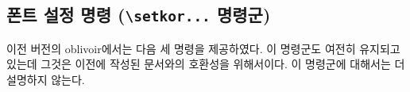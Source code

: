 \documentclass[
	12pt,
	a4paper,
	kosection,
	footnote,
	nobookmarks,
	microtype,
]{oblivoir}
\def\cs#1{\texttt{\textbackslash #1}}
\begin{document}

\subsection{폰트 설정 명령 (\protect\cs{setkor...} 명령군)}

이전 버전의 oblivoir에서는 다음 세 명령을 제공하였다.
이 명령군도 여전히 유지되고 있는데 그것은 이전에 작성된 문서와의 호환성을 위해서이다.
이 명령군에 대해서는 더 설명하지 않는다.
\end{document}

